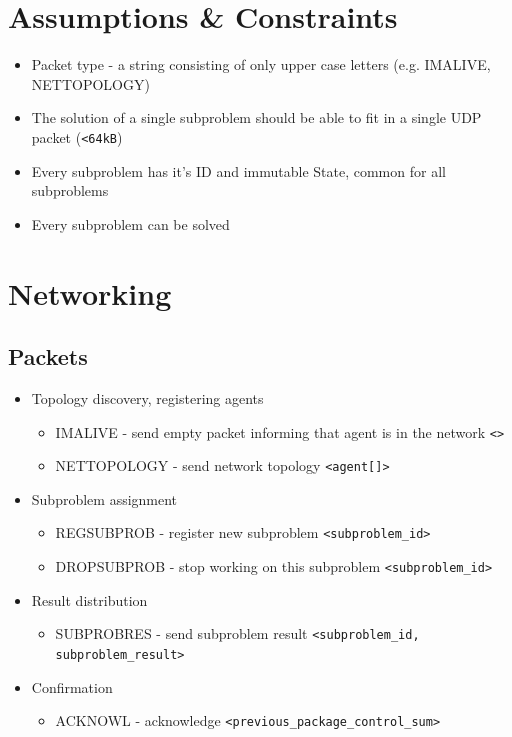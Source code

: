\documentclass{article}
\begin{document}
\section{Assumptions \& Constraints}
\begin{itemize}
    \item Packet type - a string consisting of only upper case letters (e.g. IMALIVE, NETTOPOLOGY)
    \item The solution of a single subproblem should be able to fit in a single UDP packet (\verb!<64kB!)
    \item Every subproblem has it's ID and immutable State, common for all subproblems
    \item Every subproblem can be solved
\end{itemize}

\section{Networking}
\subsection{Packets}

\begin{itemize}
    \item Topology discovery, registering agents
    \begin{itemize}
        \item IMALIVE - send empty packet informing that agent is in the network \verb!<>!
        \item NETTOPOLOGY - send network topology \verb!<agent[]>!
    \end{itemize}
    \item Subproblem assignment
    \begin{itemize}
        \item REGSUBPROB - register new subproblem \verb!<subproblem_id>!
        \item DROPSUBPROB - stop working on this subproblem \verb!<subproblem_id>!
    \end{itemize}
    \item Result distribution
    \begin{itemize}
        \item SUBPROBRES - send subproblem result \verb!<subproblem_id, subproblem_result>!
    \end{itemize}
    \item Confirmation
    \begin{itemize}
        \item ACKNOWL - acknowledge \verb!<previous_package_control_sum>!
    \end{itemize}
\end{itemize}
\end{document}
